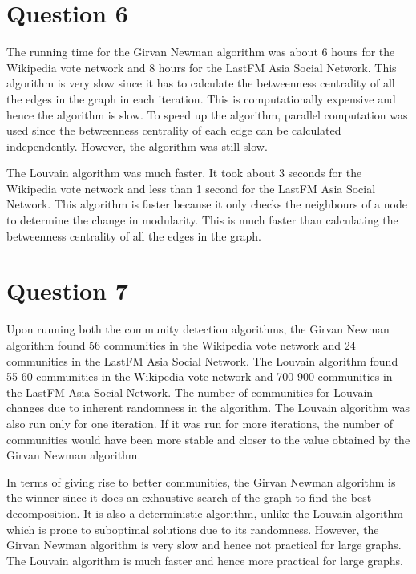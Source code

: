 \documentclass[12pt]{article}
\begin{document}
\section*{Question 6}
The running time for the Girvan Newman algorithm was about 6 hours for the Wikipedia vote network and 8 hours for the LastFM Asia Social Network. This algorithm is very slow since it has to calculate the betweenness centrality of all the edges in the graph in each iteration. This is computationally expensive and hence the algorithm is slow. To speed up the algorithm, parallel computation was used since the betweenness centrality of each edge can be calculated independently. However, the algorithm was still slow.

The Louvain algorithm was much faster. It took about 3 seconds for the Wikipedia vote network and less than 1 second for the LastFM Asia Social Network. This algorithm is faster because it only checks the neighbours of a node to determine the change in modularity. This is much faster than calculating the betweenness centrality of all the edges in the graph.


\section*{Question 7}
Upon running both the community detection algorithms, the Girvan Newman algorithm found 56 communities in the Wikipedia vote network and 24 communities in the LastFM Asia Social Network. The Louvain algorithm found 55-60 communities in the Wikipedia vote network and 700-900 communities in the LastFM Asia Social Network. The number of communities for Louvain changes due to inherent randomness in the algorithm. The Louvain algorithm was also run only for one iteration. If it was run for more iterations, the number of communities would have been more stable and closer to the value obtained by the Girvan Newman algorithm.

In terms of giving rise to better communities, the Girvan Newman algorithm is the winner since it does an exhaustive search of the graph to find the best decomposition. It is also a deterministic algorithm, unlike the Louvain algorithm which is prone to suboptimal solutions due to its randomness. However, the Girvan Newman algorithm is very slow and hence not practical for large graphs. The Louvain algorithm is much faster and hence more practical for large graphs.
\end{document}
